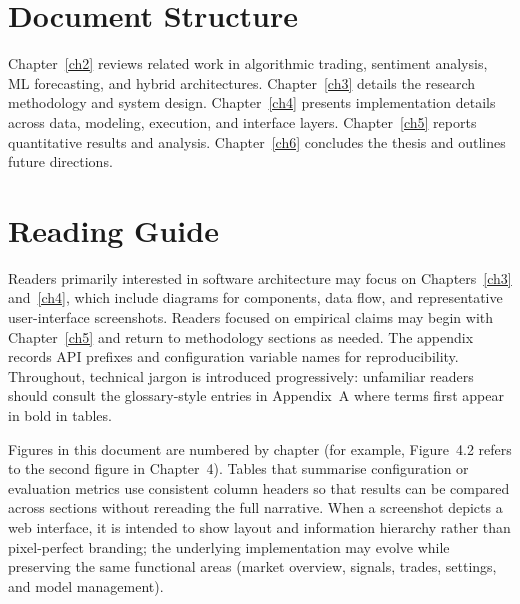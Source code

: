 \section{Document Structure}
Chapter~\ref{ch2} reviews related work in algorithmic trading, sentiment analysis, ML forecasting, and hybrid architectures. Chapter~\ref{ch3} details the research methodology and system design. Chapter~\ref{ch4} presents implementation details across data, modeling, execution, and interface layers. Chapter~\ref{ch5} reports quantitative results and analysis. Chapter~\ref{ch6} concludes the thesis and outlines future directions.

\section{Reading Guide}
Readers primarily interested in software architecture may focus on Chapters~\ref{ch3} and~\ref{ch4}, which include diagrams for components, data flow, and representative user-interface screenshots. Readers focused on empirical claims may begin with Chapter~\ref{ch5} and return to methodology sections as needed. The appendix records API prefixes and configuration variable names for reproducibility. Throughout, technical jargon is introduced progressively: unfamiliar readers should consult the glossary-style entries in Appendix~A where terms first appear in bold in tables.

Figures in this document are numbered by chapter (for example, Figure~4.2 refers to the second figure in Chapter~4). Tables that summarise configuration or evaluation metrics use consistent column headers so that results can be compared across sections without rereading the full narrative. When a screenshot depicts a web interface, it is intended to show layout and information hierarchy rather than pixel-perfect branding; the underlying implementation may evolve while preserving the same functional areas (market overview, signals, trades, settings, and model management).
